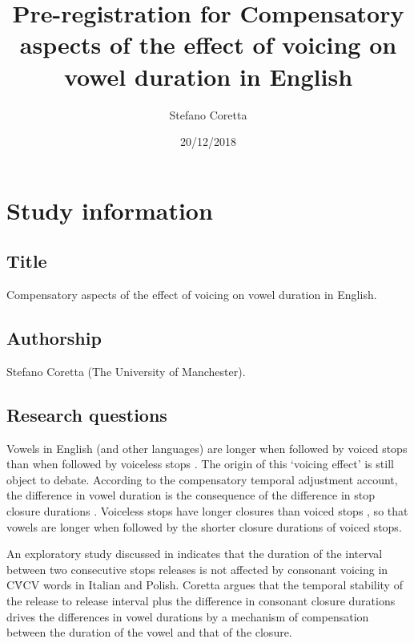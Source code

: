 \documentclass[11pt,]{article}
\title{Pre-registration for Compensatory aspects of the effect of voicing on
vowel duration in English}
\author{Stefano Coretta}
\date{20/12/2018}
\begin{document}
\maketitle

\hypertarget{study-information}{%
\section{Study information}\label{study-information}}

\hypertarget{title}{%
\subsection{Title}\label{title}}

Compensatory aspects of the effect of voicing on vowel duration in
English.

\hypertarget{authorship}{%
\subsection{Authorship}\label{authorship}}

Stefano Coretta (The University of Manchester).

\hypertarget{research-questions}{%
\subsection{Research questions}\label{research-questions}}

Vowels in English (and other languages) are longer when followed by
voiced stops than when followed by voiceless stops \citep{heffner1937}.
The origin of this `voicing effect' is still object to debate. According
to the compensatory temporal adjustment account, the difference in vowel
duration is the consequence of the difference in stop closure durations
\citep{lindblom1967, slis1969a, slis1969, lehiste1970, lehiste1970a}.
Voiceless stops have longer closures than voiced stops
\citep{lisker1957, van-summers1987, davis1989, de-jong1991}, so that
vowels are longer when followed by the shorter closure durations of
voiced stops.

An exploratory study discussed in \citet{coretta2018j} indicates that
the duration of the interval between two consecutive stops releases is
not affected by consonant voicing in CV́CV words in Italian and Polish.
Coretta argues that the temporal stability of the release to release
interval plus the difference in consonant closure durations drives the
differences in vowel durations by a mechanism of compensation between
the duration of the vowel and that of the closure.
\end{document}
